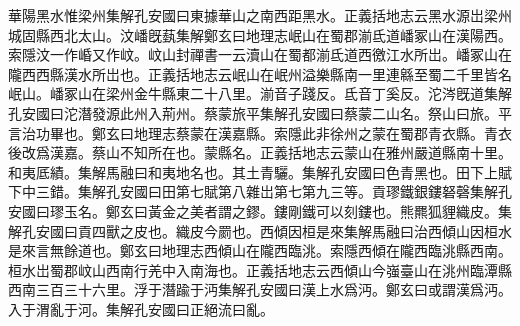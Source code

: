 華陽黑水惟梁州集解孔安國曰東據華山之南西距黑水。正義括地志云黑水源岀梁州城固縣西北太山。汶嶓旣蓺集解鄭玄曰地理志岷山在蜀郡湔氐道嶓冢山在漢陽西。索隱汶一作崏又作㞶。㞶山封禪書一云瀆山在蜀都湔氐道西徼江水所岀。嶓冢山在隴西西縣漢水所岀也。正義括地志云岷山在岷州溢樂縣南一里連緜至蜀二千里皆名岷山。嶓冢山在梁州金牛縣東二十八里。湔音子踐反。氐音丁奚反。沱涔旣道集解孔安國曰沱潛發源此州入荊州。蔡蒙旅平集解孔安國曰蔡蒙二山名。祭山曰旅。平言治功畢也。鄭玄曰地理志蔡蒙在漢嘉縣。索隱此非徐州之蒙在蜀郡青衣縣。青衣後改爲漢嘉。蔡山不知所在也。蒙縣名。正義括地志云蒙山在雅州嚴道縣南十里。和夷厎績。集解馬融曰和夷地名也。其土青驪。集解孔安國曰色青黑也。田下上賦下中三錯。集解孔安國曰田第七賦第八雜岀第七第九三等。貢璆鐵銀鏤砮磬集解孔安國曰璆玉名。鄭玄曰黃金之美者謂之鏐。鏤剛鐵可以刻鏤也。熊羆狐貍織皮。集解孔安國曰貢四獸之皮也。織皮今罽也。西傾因桓是來集解馬融曰治西傾山因桓水是來言無餘道也。鄭玄曰地理志西傾山在隴西臨洮。索隱西傾在隴西臨洮縣西南。桓水岀蜀郡㞶山西南行羌中入南海也。正義括地志云西傾山今嵹臺山在洮州臨潭縣西南三百三十六里。浮于潛踰于沔集解孔安國曰漢上水爲沔。鄭玄曰或謂漢爲沔。入于渭亂于河。集解孔安國曰正絕流曰亂。

